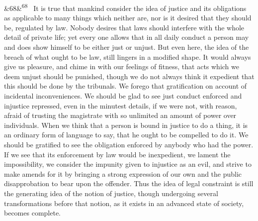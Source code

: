 \documentclass[12pt]{article}
\newcommand{\para}[1][]{\par\noindent\ifx&#1&\else\textsuperscript{\footnotesize #1}~\fi}
\begin{document}
\para[68] It is true that mankind consider the idea of justice and its obligations as applicable to many things which neither are, nor is it desired that they should be, regulated by law. Nobody desires that laws should interfere with the whole detail of private life; yet every one allows that in all daily conduct a person may and does show himself to be either just or unjust. But even here, the idea of the breach of what ought to be law, still lingers in a modified shape. It would always give us pleasure, and chime in with our feelings of fitness, that acts which we deem unjust should be punished, though we do not always think it expedient that this should be done by the tribunals. We forego that gratification on account of incidental inconveniences. We should be glad to see just conduct enforced and injustice repressed, even in the minutest details, if we were not, with reason, afraid of trusting the magistrate with so unlimited an amount of power over individuals. When we think that a person is bound in justice to do a thing, it is an ordinary form of language to say, that he ought to be compelled to do it. We should be gratified to see the obligation enforced by anybody who had the power. If we see that its enforcement by law would be inexpedient, we lament the impossibility, we consider the impunity given to injustice as an evil, and strive to make amends for it by bringing a strong expression of our own and the public disapprobation to bear upon the offender. Thus the idea of legal constraint is still the generating idea of the notion of justice, though undergoing several transformations before that notion, as it exists in an advanced state of society, becomes complete.
\end{document}
